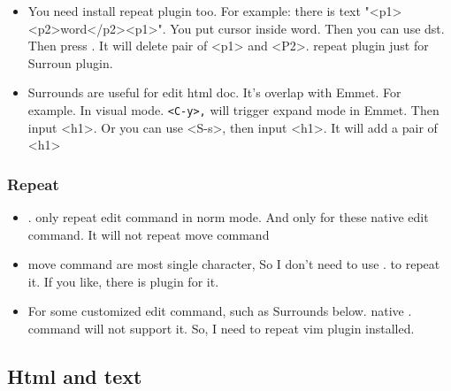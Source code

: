 \documentclass[paper=8.5in:11in, twoside, 12pt, pagesize=pdftex]{book}
\begin{document}
\begin{itemize}
		\item You need install repeat plugin too. For example: there is text "<p1><p2>word</p2><p1>". You put cursor inside word. Then you can use dst. Then press . It will delete pair of <p1> and <P2>. repeat plugin just for Surroun plugin. 
		
		\item Surrounds are useful for edit html doc. It's overlap with Emmet. For example. In visual mode. \verb=<C-y>,= will trigger expand mode in Emmet. Then input <h1>. Or you can use <S-s>, then input <h1>. It will add a pair of <h1> 
	\end{itemize}
	
	\subsubsection{Repeat}
	\begin{itemize}
		\item . only repeat edit command in norm mode. And only for these native edit command. It will not repeat move command
		
		\item move command are most single character, So I don't need to use . to repeat it. If you like, there is plugin for it. 
		
		\item For some customized edit command, such as Surrounds below. native . command will not support it. So, I need to repeat vim plugin installed. 
	\end{itemize}
	
	\subsection{Html and text}
	
\end{document}
